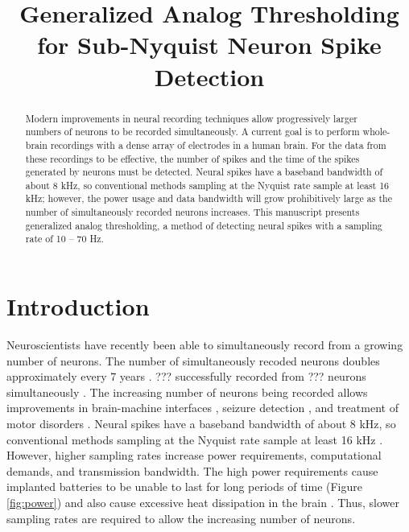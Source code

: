 \documentclass[10 pt]{article}
\title{Generalized Analog Thresholding for Sub-Nyquist Neuron Spike Detection}
\author{}
\date{}
\begin{document}
\maketitle

\begin{abstract}
Modern improvements in neural recording techniques allow progressively larger numbers of neurons to be recorded simultaneously.
A current goal is to perform whole-brain recordings with a dense array of electrodes in a human brain.
For the data from these recordings to be effective, the number of spikes and the time of the spikes generated by neurons must be detected.
Neural spikes have a baseband bandwidth of about 8 kHz, so conventional methods sampling at the Nyquist rate sample at least 16 kHz; %
however, the power usage and data bandwidth will grow prohibitively large as the number of simultaneously recorded neurons increases.
This manuscript presents generalized analog thresholding, a method of detecting neural spikes with a sampling rate of 10 -- 70 Hz. %
\end{abstract}

\section{Introduction}

Neuroscientists have recently been able to simultaneously record from a growing number of neurons.
The number of simultaneously recoded neurons doubles approximately every 7 years \cite{SK2011}.
??? successfully recorded from ??? neurons simultaneously \cite{???}.
The increasing number of neurons being recorded allows improvements in brain-machine interfaces \cite{???}, seizure detection \cite{???}, and treatment of motor disorders \cite{???}.
Neural spikes have a baseband bandwidth of about 8 kHz, so conventional methods sampling at the Nyquist rate sample at least 16 kHz \cite{CUS2012}.
However, higher sampling rates increase power requirements, computational demands, and transmission bandwidth.
The high power requirements cause implanted batteries to be unable to last for long periods of time (Figure \ref{fig:power}) and also cause excessive heat dissipation in the brain \cite{???}.
Thus, slower sampling rates are required to allow the increasing number of neurons.
\end{document}
